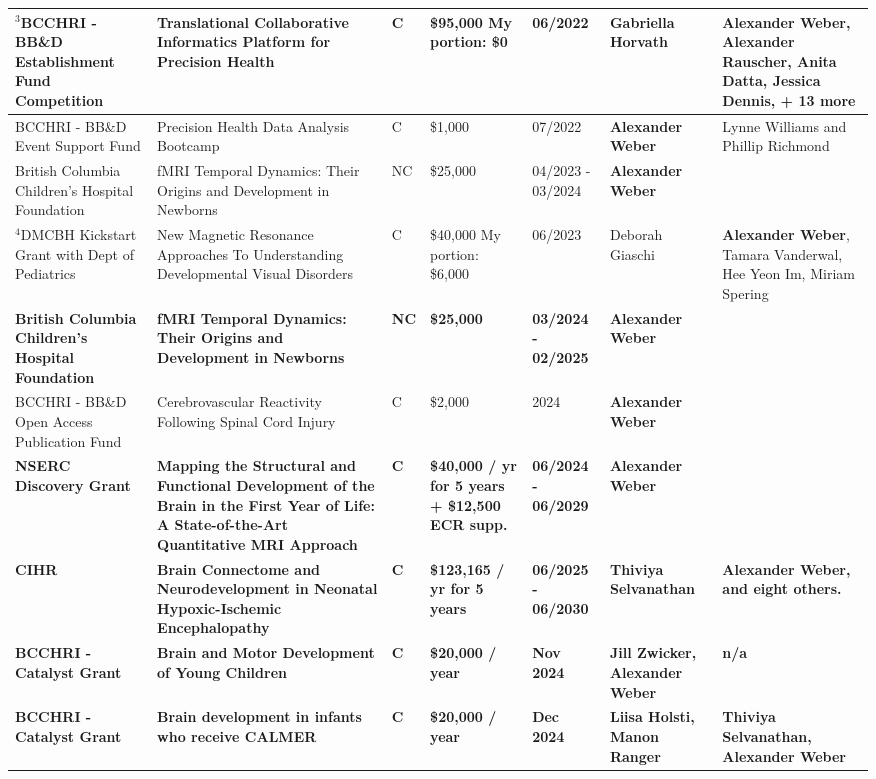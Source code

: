 \documentclass[11pt,notitlepage,english]{report}
\begin{document}
\begin{longtable}{|L{2.7cm}|L{4cm}|L{1cm}|L{2cm}|L{1.7cm}|L{2cm}|L{3cm}|}
  \hline
  $^{3}$BCCHRI - BB\&D Establishment Fund Competition & Translational Collaborative Informatics Platform for Precision Health & C & \$95,000 \newline My portion: \$0 & 06/2022 & Gabriella Horvath & \textbf{Alexander Weber}, Alexander Rauscher, Anita Datta, Jessica Dennis, + 13 more \\
  \hline
  BCCHRI - BB\&D Event Support Fund & Precision Health Data Analysis Bootcamp & C & \$1,000 & 07/2022 & \textbf{Alexander Weber} & Lynne Williams and Phillip Richmond \\
  \hline
  British Columbia Children's Hospital Foundation & fMRI Temporal Dynamics: Their Origins and Development in Newborns & NC & \$25,000 & 04/2023 - 03/2024 & \textbf{Alexander Weber} & \\
  \hline
$^{4}$DMCBH Kickstart Grant with Dept of Pediatrics & New Magnetic Resonance Approaches To Understanding Developmental Visual Disorders & C & \$40,000 \newline \newline My portion: \$6,000 & 06/2023 & Deborah Giaschi & \textbf{Alexander Weber}, Tamara Vanderwal, Hee Yeon Im, Miriam Spering \\
  \hline
  \textbf{British Columbia Children's Hospital Foundation} & \textbf{fMRI Temporal Dynamics: Their Origins and Development in Newborns} & \textbf{NC} & \textbf{\$25,000} & \textbf{03/2024 - 02/2025} & \textbf{Alexander Weber} & \\
  \hline
  BCCHRI - BB\&D Open Access Publication Fund & Cerebrovascular Reactivity Following Spinal Cord Injury & C & \$2,000 & 2024 & \textbf{Alexander Weber} & \\
  \hline
  \textbf{NSERC Discovery Grant} & \textbf{Mapping the Structural and Functional Development of the Brain in the First Year of Life: A State-of-the-Art Quantitative MRI Approach} & \textbf{C} & \textbf{\$40,000 / yr for 5 years \newline + \$12,500 ECR supp.} & \textbf{06/2024 - 06/2029} & \textbf{Alexander Weber} & \\
  \hline
  \textbf{CIHR} & \textbf{Brain Connectome and Neurodevelopment in Neonatal Hypoxic-Ischemic Encephalopathy} & \textbf{C} & \textbf{\$123,165 / yr for 5 years} & \textbf{06/2025 - 06/2030} & \textbf{Thiviya Selvanathan } & \textbf{Alexander Weber, and eight others.}\\
  \hline
  \textbf{BCCHRI - Catalyst Grant} & \textbf{Brain and Motor Development of Young Children} & \textbf{C} & \textbf{\$20,000 / year} & \textbf{Nov 2024} & \textbf{Jill Zwicker, Alexander Weber} & \textbf{n/a} \\
  \hline
  \textbf{BCCHRI - Catalyst Grant} & \textbf{Brain development in infants who receive CALMER} & \textbf{C} & \textbf{\$20,000 / year} & \textbf{Dec 2024} & \textbf{Liisa Holsti, Manon Ranger} & \textbf{Thiviya Selvanathan,} \textbf{Alexander Weber} \\
  \hline
\end{longtable}
\end{document}
